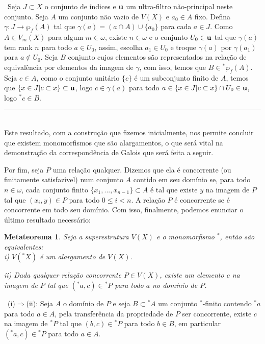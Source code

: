 \documentclass[12pt,a4paper]{article}
\newtheorem{mthrm}[mydef]{Metateorema}
\def\dem{\par\smallbreak\noindent {\textit{ Demonstração:}} \ }
\def\eop{\hfill\rule{2.5mm}{2.5mm} \\ }
\theoremstyle{definition}
\begin{document}
\dem Seja $J\subset X$ o conjunto de índices e $\bf{u}$ um ultra-filtro não-principal neste conjunto. Seja $A$ um conjunto não vazio de $V(X)$ e $a_0\in A$ fixo. Defina $\gamma: J\rightarrow \wp_f(A)$ tal que $\gamma(a)=(a\cap A)\cup \{a_0\}$ para cada $a\in J$. Como $A\in V_m(X)$ para algum $m\in\omega$, existe $n\in \omega$ e o conjunto $U_0\in \bf{u}$ tal que $\gamma(a)$ tem rank $n$ para todo $a\in U_0$, assim, escolha $a_1\in U_0$ e troque $\gamma(a)$ por $\gamma(a_1)$ para $a\notin U_0$. Seja $B$ conjunto cujos elementos são representados na relação de equivalência por elementos da imagem de $\gamma$, com isso, temos que $B\in {^* \wp_f (A)}$. Seja $c\in A$, como o conjunto unitário $\{c\}$ é um subconjunto finito de $A$, temos que $\{x\in J | c\subset x\}\subset \bf{u}$, logo $c\in \gamma(a)$ para todo $a\in \{x\in J | c\subset x\}\cap U_0\in \bf{u}$, logo $^*c\in B$. \eop

Este resultado, com a construção que fizemos inicialmente, nos permite concluir que existem monomorfismos que são alargamentos, o que será vital na demonstração da correspondência de Galois que será feita a seguir. 

Por fim, seja $P$ uma relação qualquer. Dizemos que ela é concorrente (ou finitamente satisfazível) num conjunto $A$ contido em seu domínio se, para todo $n\in \omega$, cada conjunto finito $\{x_1,...,x_{n-1}\}\subset A$ é tal que existe $y$ na imagem de $P$ tal que $(x_i,y)\in P$ para todo $0\leq i < n$. A relação $P$ é concorrente se é concorrente em todo seu domínio. Com isso, finalmente, podemos enunciar o último resultado necessário:

\begin{mthrm}
    
        Seja a superestrutura $V(X)$ e o monomorfismo $^*$, então são equivalentes: \\
        
        i) $V({^*X})$ é um alargamento de $V(X)$.
        
        ii) Dada qualquer relação concorrente $P\in V(X)$, existe um elemento $c$ na imagem de $P$ tal que $({^*a},c)\in {^*P}$ para todo $a$ no domínio de $P$.
    
\end{mthrm}

\dem (i)$\Rightarrow$(ii): Seja $A$ o domínio de $P$ e seja $B\subset {^*A}$ um conjunto $^*$-finito contendo $^*a$ para todo $a\in A$, pela transferência da propriedade de $P$ ser concorrente, existe $c$ na imagem de $^*P$ tal que $(b,c)\in {^*P}$ para todo $b\in B$, em particular $({^*a},c)\in {^*P}$ para todo $a\in A$. 
\end{document}
